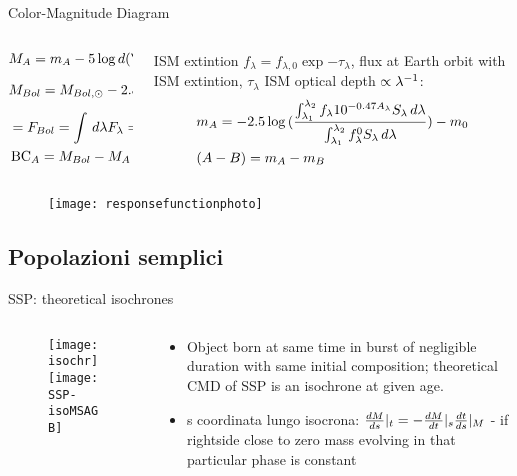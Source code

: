 \begin{frame}{Color-Magnitude Diagram}
\begin{columns}[T]
\begin{column}{0.45\textwidth}
\begin{align*}
&M_A=m_A-5\log{d(\si{\parsec})}+5\\
&M_{Bol}=M_{Bol,\odot}-2.5\log{\frac{4\pi R^2F_{Bol}}{\lsun{}}}\\
&=F_{Bol}=\int\,d\lambda F_{\lambda}=\frac{ac}{4}T_e^4\\
&\BC_A=M_{Bol}-M_A
\end{align*}
\end{column}
\begin{column}{0.55\textwidth}
ISM extintion $f_{\lambda}=f_ {\lambda,0}\exp{-\tau_{\lambda}}$, flux at Earth orbit with ISM extintion, $\tau_{\lambda}$ ISM optical depth $\propto\invers{\lambda}$:
\begin{align*}
&m_A=-2.5\log{(\frac{\int_{\lambda_1}^{\lambda_2}f_{\lambda}10\expy{-0.47A_{\lambda}}S_{\lambda}\,d\lambda}{\int_{\lambda_1}^{\lambda_2}f_{\lambda}^0S_{\lambda}\,d\lambda})}-m_0\\
&(A-B)=m_A-m_B
\end{align*}
\end{column}
\end{columns}
\begin{figure}[!ht]
	\texttt{[image: responsefunctionphoto]}
\end{figure}

\end{frame}

\subsection{Popolazioni semplici}

\begin{frame}{SSP: theoretical isochrones}
\begin{columns}[T]
\begin{column}{0.45\textwidth}
\begin{figure}[!ht]
\texttt{[image: isochr]}
\texttt{[image: SSP-isoMSAGB]}
\end{figure}
\end{column}
\begin{column}{0.45\textwidth}
\begin{itemize}
\item Object born at same time in burst of negligible duration with same initial composition; theoretical CMD of SSP is an isochrone at given age.
\item s coordinata lungo isocrona: $\TDy{s}{M}|_t=-\TDy{t}{M}|_s\TDy{s}{t}|_M$ - if rightside close to zero mass evolving in that particular phase is constant
\end{itemize}
\end{column}
\end{columns}
\end{frame}

